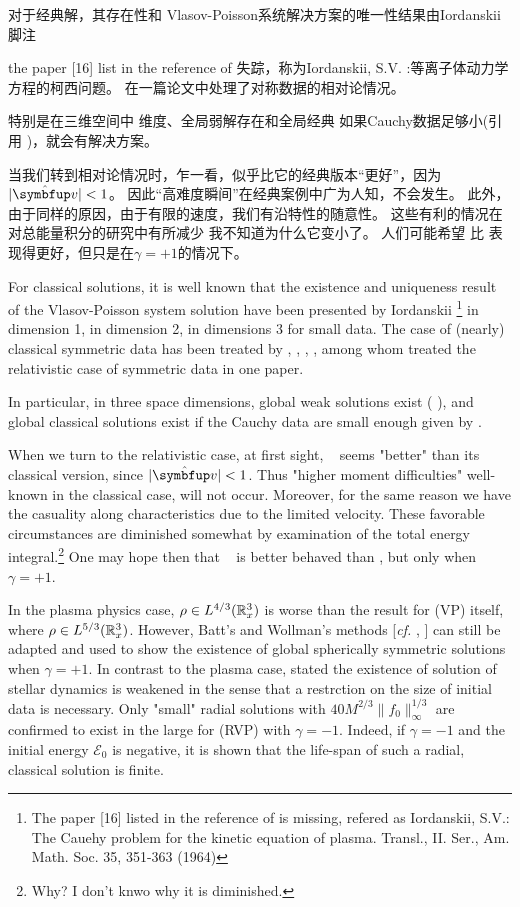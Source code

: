 对于经典解，其存在性和
Vlasov-Poisson系统解决方案的唯一性结果由Iordanskii脚注{the paper [16] list in the reference of  失踪，称为Iordanskii, S.V.
:等离子体动力学方程的柯西问题。
在一篇论文中处理了对称数据的相对论情况。

特别是在三维空间中
维度、全局弱解存在和全局经典
如果Cauchy数据足够小(引用
)，就会有解决方案。


当我们转到相对论情况时，乍一看，\eqrvp 似乎比它的经典版本“更好”，因为$|\hat{\vv}|<1$。
因此“高难度瞬间”在经典案例中广为人知，不会发生。
此外，由于同样的原因，由于有限的速度，我们有沿特性的随意性。
这些有利的情况在对总能量积分的研究中有所减少
我不知道为什么它变小了。
人们可能希望 \eqrvm 比 \eqvm 表现得更好，但只是在$\gamma=+1$的情况下。


For classical solutions, it is well known that the existence and
uniqueness result of the Vlasov-Poisson system solution have been presented by Iordanskii \footnote{The paper [16] listed in the reference of \cite{1991InMat.105..415L} is missing, refered as Iordanskii, S.V.: The Cauehy problem for the kinetic equation of plasma. Transl., II. Ser.,
Am. Math. Soc. 35, 351-363 (1964)} in dimension
1, \cite{ukai1978classical} in dimension 2, \cite{bardos1985global} in dimensions
3 for small data. 
The case of (nearly) classical symmetric data has been treated by \cite{batt1977global}, \cite{wollman-1980-symmetric}, \cite{horst1981classical}, \cite{schaeffer1987global}, among whom \cite{schaeffer1987global} treated the relativistic case of symmetric data in one paper.

In particular, in three space 
dimensions, global weak solutions exist ( \cite{arsenev_global_1975, abdallah_weak_1994} ), and global classical 
solutions exist if the Cauchy data are small enough given by \cite{bardos1985global}.


When we turn to the relativistic case, at first sight, \eqrvp~ seems "better" than its classical version, since $|\hat{\vv}|<1$. Thus 
"higher moment difficulties" well-known in the classical case, will not occur. 
Moreover, for the same reason we have the casuality along characteristics due to the limited velocity. These favorable circumstances are diminished somewhat by examination of the total energy integral.\footnote{Why? I don't knwo why it is diminished.} One may hope then that \eqrvm~ is better behaved than \eqvm, but only when $\gamma=+1$. 



In the plasma physics case, $\rho\in L^{4/3}({\mathbb{R}}_{x}^{3})$ is worse than the result for (VP) itself, where 
$\rho\in L^{5/3}({\mathbb{R}}_{x}^{3})$. However, Batt's and Wollman's methods [\textit{cf.} \cite{batt1977global}, \cite{wollman-1980-symmetric}] 
can still be adapted and used to show the existence of global spherically symmetric solutions when $\gamma=+1$. In contrast to the plasma case, \cite{glassey_symmetric_1985} stated the existence of solution of stellar dynamics is weakened in the sense that a restrction on the size of initial data is necessary. Only "small" radial solutions with $40M^{2/3}\|f_0\|_\infty^{1/3}$ are confirmed to exist in the large for (RVP) with $\gamma=-1$. Indeed, if $\gamma =-1$ and the initial energy $\mathcal{E}_0$ is negative, it is shown that the life-span of such a radial, classical solution is 
finite. 

}
